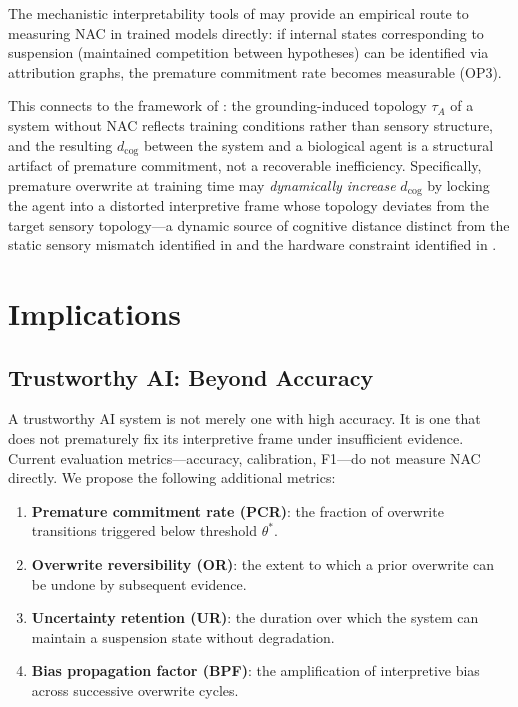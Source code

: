 \documentclass[12pt]{article}
\begin{document}
The mechanistic interpretability tools of \cite{anthropic2025circuit}
may provide an empirical route to measuring NAC in trained models
directly: if internal states corresponding to suspension (maintained
competition between hypotheses) can be identified via attribution
graphs, the premature commitment rate becomes measurable (OP3).

This connects to the framework of \cite{minamoto2026topology}: the
grounding-induced topology $\tau_A$ of a system without NAC reflects
training conditions rather than sensory structure, and the resulting
$d_\mathrm{cog}$ between the system and a biological agent is a
structural artifact of premature commitment, not a recoverable
inefficiency. Specifically, premature overwrite at training time may
\emph{dynamically increase} $d_\mathrm{cog}$ by locking the agent
into a distorted interpretive frame whose topology deviates from the
target sensory topology---a dynamic source of cognitive distance
distinct from the static sensory mismatch identified in
\cite{minamoto2026topology} and the hardware constraint identified
in \cite{minamoto2026cgla}.

\section{Implications}

\subsection{Trustworthy AI: Beyond Accuracy}

A trustworthy AI system is not merely one with high accuracy.
It is one that does not prematurely fix its interpretive frame
under insufficient evidence.
Current evaluation metrics---accuracy, calibration, F1---do not
measure NAC directly.
We propose the following additional metrics:

\begin{enumerate}
  \item \textbf{Premature commitment rate (PCR)}: the fraction of
        overwrite transitions triggered below threshold $\theta^*$.
  \item \textbf{Overwrite reversibility (OR)}: the extent to which
        a prior overwrite can be undone by subsequent evidence.
  \item \textbf{Uncertainty retention (UR)}: the duration over which
        the system can maintain a suspension state without degradation.
  \item \textbf{Bias propagation factor (BPF)}: the amplification
        of interpretive bias across successive overwrite cycles.
\end{enumerate}
\end{document}
